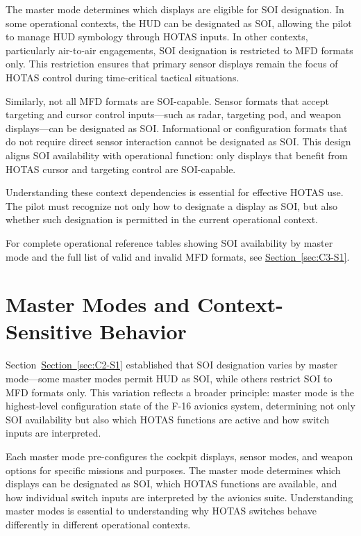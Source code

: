 \documentclass[11pt, a4paper, twoside]{report}
\newcommand{\secref}[1]{\hyperref[#1]{Section~\ref*{#1}}}
\begin{document}
The master mode determines which displays are eligible for SOI designation. In some operational contexts, the HUD can be designated as SOI, allowing the pilot to manage HUD symbology through HOTAS inputs. In other contexts, particularly air-to-air engagements, SOI designation is restricted to MFD formats only. This restriction ensures that primary sensor displays remain the focus of HOTAS control during time-critical tactical situations.

Similarly, not all MFD formats are SOI-capable. Sensor formats that accept targeting and cursor control inputs—such as radar, targeting pod, and weapon displays—can be designated as SOI. Informational or configuration formats that do not require direct sensor interaction cannot be designated as SOI. This design aligns SOI availability with operational function: only displays that benefit from HOTAS cursor and targeting control are SOI-capable.

Understanding these context dependencies is essential for effective HOTAS use. The pilot must recognize not only how to designate a display as SOI, but also whether such designation is permitted in the current operational context.

For complete operational reference tables showing SOI availability by master mode and the full list of valid and invalid MFD formats, see \secref{sec:C3-S1}.

\section{Master Modes and Context-Sensitive Behavior}
\label{sec:C2-S2}

Section~\secref{sec:C2-S1} established that SOI designation varies by master mode—some master modes permit HUD as SOI, while others restrict SOI to MFD formats only. This variation reflects a broader principle: master mode is the highest-level configuration state of the F-16 avionics system, determining not only SOI availability but also which HOTAS functions are active and how switch inputs are interpreted.

Each master mode pre-configures the cockpit displays, sensor modes, and weapon options for specific missions and purposes. The master mode determines which displays can be designated as SOI, which HOTAS functions are available, and how individual switch inputs are interpreted by the avionics suite. Understanding master modes is essential to understanding why HOTAS switches behave differently in different operational contexts.
\end{document}
